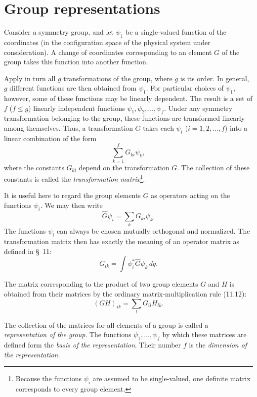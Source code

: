 \section{Group representations}

Consider a symmetry group, and let $\psi_1$ be a single-valued function of the coordinates (in the configuration space of the physical system under consideration). A change of coordinates corresponding to an element $G$ of the group takes this function into another function.

Apply in turn all $g$ transformations of the group, where $g$ is its order. In general, $g$ different functions are then obtained from $\psi_1$. For particular choices of $\psi_1$, however, some of these functions may be linearly dependent. The result is a set of $f$ ($f\leqslant g$) linearly independent functions $\psi_1,\psi_2,\ldots,\psi_f$. Under any symmetry transformation belonging to the group, these functions are transformed linearly among themselves. Thus, a transformation $G$ takes each $\psi_i$ ($i=1,2,\ldots,f$) into a linear combination of the form
\[
 \sum_{k=1}^f G_{ki}\psi_k,
\]
where the constants $G_{ki}$ depend on the transformation $G$. The collection of these constants is called the \emph{transformation matrix}\footnote{Because the functions $\psi_i$ are assumed to be single-valued, one definite matrix corresponds to every group element.}.

It is useful here to regard the group elements $G$ as operators acting on the functions $\psi_i$. We may then write
\begin{equation}
 \widehat G\psi_i=\sum_kG_{ki}\psi_k.
 \tag{94.1}
\end{equation}
The functions $\psi_i$ can always be chosen mutually orthogonal and normalized. The transformation matrix then has exactly the meaning of an operator matrix as defined in \S~11:
\begin{equation}
 G_{ik}=\int\psi_i^*\widehat G\psi_k\,dq.
 \tag{94.2}
\end{equation}

The matrix corresponding to the product of two group elements $G$ and $H$ is obtained from their matrices by the ordinary matrix-multiplication rule (11.12):
\begin{equation}
 (GH)_{ik}=\sum_lG_{il}H_{lk}.
 \tag{94.3}
\end{equation}

The collection of the matrices for all elements of a group is called a \emph{representation of the group}. The functions $\psi_1,\ldots,\psi_f$ by which these matrices are defined form the \emph{basis of the representation}. Their number $f$ is the \emph{dimension of the representation}.

